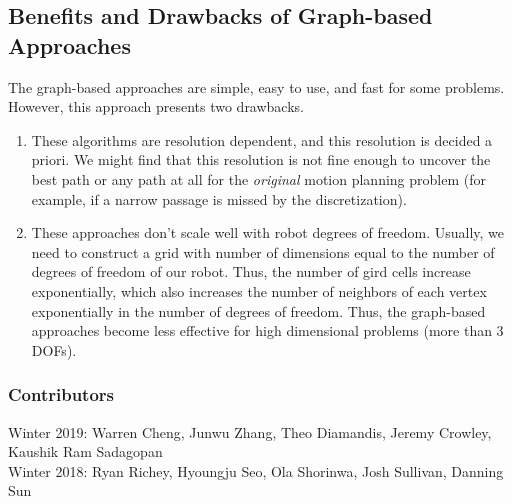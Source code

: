 \documentclass[twoside]{article}
\begin{document}
\subsection{Benefits and Drawbacks of Graph-based Approaches}
The graph-based approaches are simple, easy to use, and fast for some problems. However, this approach presents two drawbacks.
\begin{enumerate}
\item These algorithms are resolution dependent, and this resolution is decided a priori. We might find that this resolution is not fine enough to uncover the best path or any path at all for the \textit{original} motion planning problem (for example, if a narrow passage is missed by the discretization).
\item These approaches don't scale well with robot degrees of freedom. Usually, we need to construct a grid with number of dimensions equal to the number of degrees of freedom of our robot. Thus, the number of gird cells increase exponentially, which also increases the number of neighbors of each vertex exponentially in the number of degrees of freedom. Thus, the graph-based approaches become less effective for high dimensional problems (more than 3 DOFs).
\end{enumerate}




\printbibliography

\subsubsection*{Contributors}
Winter 2019: Warren Cheng,  Junwu Zhang, Theo Diamandis, Jeremy Crowley, Kaushik Ram Sadagopan\\
Winter 2018: Ryan Richey, Hyoungju Seo, Ola Shorinwa, Josh Sullivan, Danning Sun
\end{document}

